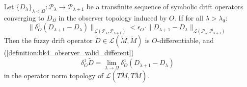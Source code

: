 \begin{lemma} \label{lemma:bk4_convergence_of_symbolic_drift}

Let $\{D_\lambda\}_{\lambda < \Omega}: \mathcal{P}_\lambda \to \mathcal{P}_{\lambda+1}$ be a transfinite sequence of symbolic drift operators converging to $D_\Omega$ in the observer topology induced by $O$. If for all $\lambda > \lambda_0$:
\[
\|\delta^1_O(D_{\lambda+1} - D_\lambda)\|_{\mathcal{L}(\mathcal{P}_\lambda, \mathcal{P}_{\lambda+1})} < \epsilon_O \cdot \|D_{\lambda+1} - D_\lambda\|_{\mathcal{L}(\mathcal{P}_\lambda, \mathcal{P}_{\lambda+1})}
\]
Then the fuzzy drift operator $\widetilde{D} \in \mathcal{L}(\widetilde{M}, \widetilde{M})$ is $O$-differentiable, and (\ref{definition:bk4_observer_valid_different})
\[
\delta^1_O \widetilde{D} = \lim_{\lambda \to \Omega} \delta^1_O(D_{\lambda+1} - D_\lambda)
\]
in the operator norm topology of $\mathcal{L}(T\widetilde{M}, T\widetilde{M})$.
\end{lemma}

